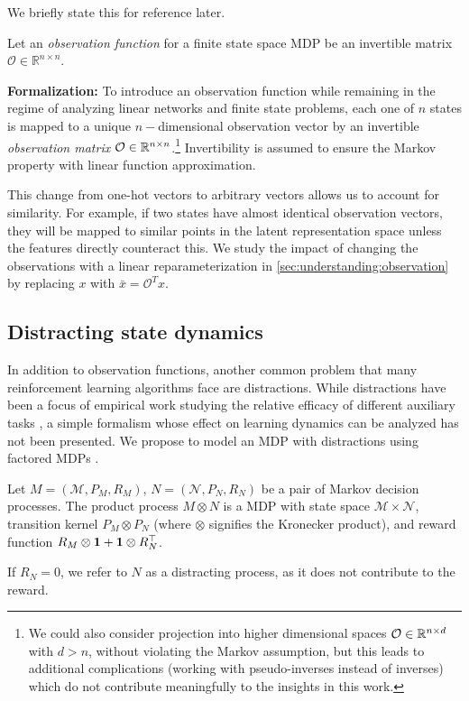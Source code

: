 We briefly state this for reference later.
\begin{assumption}
    \label{assumption:understanding:2}
    Let an \emph{observation function} for a finite state space MDP be an invertible matrix $\mathcal{O} \in \mathbb{R}^{n \times n}$.
\end{assumption}

\textbf{Formalization:} To introduce an observation function while remaining in the regime of analyzing linear networks and finite state problems, each one of $n$ states is mapped to a unique $n-$dimensional observation vector by an invertible \emph{observation matrix} ${\mathcal{O}} \in \mathbb{R}^{n \times n}$.\footnote{We could also consider projection into higher dimensional spaces ${\mathcal{O}} \in \mathbb{R}^{n \times d}$ with $d > n$, without violating the Markov assumption, but this leads to additional complications (working with pseudo-inverses instead of inverses) which do not contribute meaningfully to the insights in this work.}
Invertibility is assumed to ensure the Markov property with linear function approximation.

This change from one-hot vectors to arbitrary vectors allows us to account for similarity.
For example, if two states have almost identical observation vectors, they will be mapped to similar points in the latent representation space unless the features directly counteract this.
We study the impact of changing the observations with a linear reparameterization in \autoref{sec:understanding:observation} by replacing $x$ with $\bar{x} = \mathcal{O}^T x$.

\subsection{Distracting state dynamics}
In addition to observation functions, another common problem that many reinforcement learning algorithms face are distractions.
While distractions have been a focus of empirical work studying the relative efficacy of different auxiliary tasks \parencite{ni2024bridging}, a simple formalism whose effect on learning dynamics can be analyzed has not been presented. 
We propose to model an MDP with distractions using factored MDPs \parencite{boutilier2000stochastic}.

\begin{definition}\label{def:distracting}
Let $M=(\mathcal{M}, P_{M},R_M)$,  $N=(\mathcal{N},P_N,R_N)$ be a pair of Markov decision processes.
The product process $M \otimes N$ is a MDP with state space $\mathcal{M}\times \mathcal{N}$, transition kernel $P_M\otimes P_N$ (where $\otimes$ signifies the Kronecker product), and reward function $R_M\otimes {\bm{1}} +{\bm{1}} \otimes R_N^\top$.

If $R_N = 0$, we refer to $N$ as a distracting process, as it does not contribute to the reward.
\end{definition}

